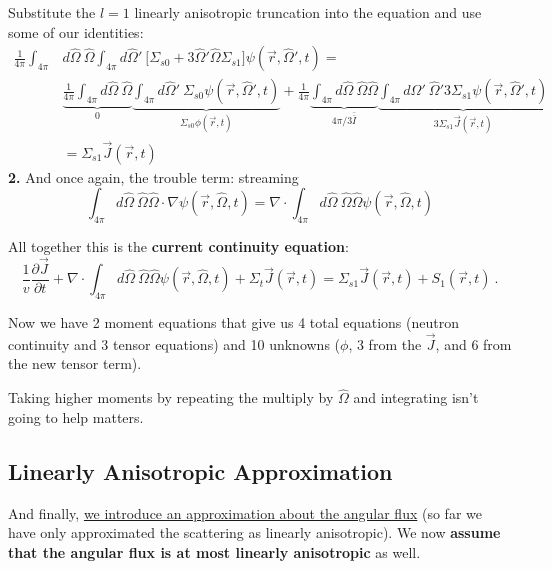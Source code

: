 \documentclass[12pt]{article}
\newcommand{\vOmega}{\ensuremath{\hat{\Omega}}}
\begin{document}
Substitute the $l=1$ linearly anisotropic truncation into the equation and use some of our identities:
%
\begin{align*}
\frac{1}{4\pi} \int_{4\pi}  &d\vOmega
\: \vOmega  \int_{4\pi} d\vOmega'\: \bigl[\Sigma_{s0} + 3\vOmega' \vOmega \Sigma_{s1} \bigr] \psi(\vec{r}, \vOmega', t) = \nonumber\\
%
& \underbrace{\frac{1}{4\pi} \int_{4\pi} d\vOmega \:\vOmega}_{0}  \underbrace{\int_{4\pi} d\vOmega'\:  \Sigma_{s0}\psi(\vec{r}, \vOmega', t)}_{\Sigma_{s0} \phi(\vec{r},t)} +
%
\frac{1}{4\pi} \underbrace{\int_{4\pi} d\vOmega \:\vOmega \vOmega}_{4\pi/3 \bar{\bar{I}}} \underbrace{\int_{4\pi} d\vOmega'\: \vOmega' 3  \Sigma_{s1}\psi(\vec{r}, \vOmega', t)}_{3\Sigma_{s1} \vec{J}(\vec{r},t)} \\
%
&= \boxed{\Sigma_{s1} \vec{J}(\vec{r},t)}
\end{align*}
\textbf{2.} And once again, the trouble term: streaming
%
\[\int_{4\pi} d\vOmega \:\vOmega \vOmega \cdot \nabla \psi(\vec{r}, \vOmega, t) = \nabla \cdot \int_{4\pi} d\vOmega \:\vOmega \vOmega \psi(\vec{r}, \vOmega, t) \]

\vspace*{2em}
All together this is the \textbf{current continuity equation}:
\begin{equation}
\frac{1}{v}\frac{\partial \vec{J}}{\partial t} 
+ \nabla \cdot \int_{4\pi} d\vOmega \:\vOmega \vOmega \psi(\vec{r}, \vOmega, t) +
\Sigma_t  \vec{J}(\vec{r}, t) =
\Sigma_{s1} \vec{J}(\vec{r},t)
+ S_{1}(\vec{r}, t) \:.
\label{eq:currentcont}
\end{equation}

Now we have 2 moment equations that give us 4 total equations (neutron continuity and 3 tensor equations) and 10 unknowns ($\phi$, 3 from the $\vec{J}$, and 6 from the new tensor term). 

Taking higher moments by repeating the multiply by $\vOmega$ and integrating isn't going to help matters.


\subsection*{Linearly Anisotropic Approximation}
And finally, \underline{we introduce an approximation about the angular flux} (so far we have only approximated the scattering as linearly anisotropic). We now \textbf{assume that the angular flux is at most linearly anisotropic} as well.
\end{document}
